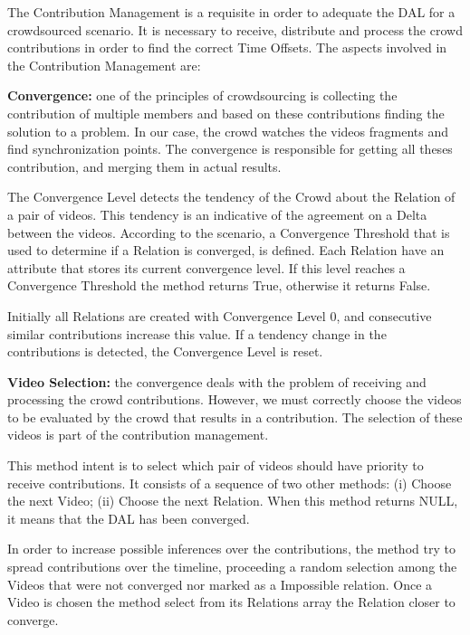 The Contribution Management is a requisite in order to adequate the DAL for a crowdsourced scenario. It is necessary to receive, distribute and process the crowd contributions in order to find the correct Time Offsets. The aspects involved in the Contribution Management are:

	\textbf{Convergence:} one of the principles of crowdsourcing is collecting the contribution of multiple members and based on these contributions finding the solution to a problem. In our case, the crowd watches the videos fragments and find synchronization points. The convergence is responsible for getting all theses contribution, and merging them in actual results.
	
	The Convergence Level detects the tendency of the Crowd about the Relation of a pair of videos. This tendency is an indicative of the agreement on a Delta between the videos. According to the scenario, a Convergence Threshold that is used to determine if a Relation is converged, is defined. Each Relation have an attribute that stores its current convergence level. If this level reaches a Convergence Threshold the method returns True, otherwise it returns False.

	Initially all Relations are created with Convergence Level 0, and consecutive similar contributions increase this value. If a tendency change in the contributions is detected, the Convergence Level is reset.
	
	\textbf{Video Selection:} the convergence deals with the problem of receiving and processing the crowd contributions. However, we must correctly choose the videos to be evaluated by the crowd that results in a contribution. The selection of these videos is part of the contribution management. 
	
	This method intent is to select which pair of videos should have priority to receive contributions. It consists of a sequence of two other methods: (i) Choose the next Video; (ii) Choose the next Relation. When this method returns NULL, it means that the DAL has been converged.
	
In order to increase possible inferences over the contributions, the method try to spread contributions over the timeline, proceeding a random selection among the Videos that were not converged nor marked as a Impossible relation. Once a Video is chosen the method select from its Relations array the Relation closer to converge.